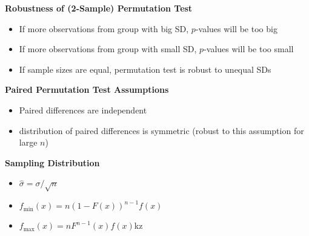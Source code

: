 \documentclass[10pt]{article}
\begin{document}
\textbf{Robustness of (2-Sample) Permutation Test}
\begin{itemize}
    \item If more observations from group with big SD, $p$-values will be too big
    \item If more observations from group with small SD, $p$-values will be too small
    \item If sample sizes are equal, permutation test is robust to unequal SDs
\end{itemize}

\textbf{Paired Permutation Test Assumptions}
\begin{itemize}
    \item Paired differences are independent
    \item distribution of paired differences is symmetric (robust to this assumption for large $n$)
\end{itemize}

\textbf{Sampling Distribution}
\begin{itemize}
    \item $\hat{\sigma} = \sigma / \sqrt{n}$
    \item $f_{\min}(x)=n(1-F(x))^{n-1}f(x)$
    \item $f_{\max}(x)=nF^{n-1}(x)f(x)$kz
\end{itemize}
\end{document}
